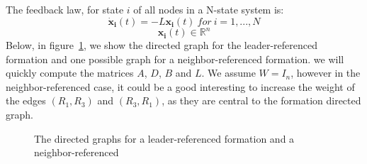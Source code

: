 \documentclass[a4paper, 12pt]{report}
\begin{document}
The feedback law, for state $i$ of all nodes in a N-state system is:
\[ \boldsymbol{\dot x_i}(t) = - L\boldsymbol{x_i}(t)\ for\ i=1, ..., N \]
\[\boldsymbol{x_i}(t) \in \mathbb{R}^n\]
Below, in figure~\ref{fig:graphs}, we show the directed graph for the leader-referenced formation and one possible graph for a neighbor-referenced formation. we will quickly compute the matrices $A$, $D$, $B$ and $L$. We assume $W = I_{n}$, however in the neighbor-referenced case, it could be a good interesting to increase the weight of the edges $(R_1, R_3)$ and $(R_3, R_1)$, as they are central to the formation directed graph.

\begin{figure}[h]
\centering
{}
\hspace{0.5cm}
\caption{The directed graphs for a leader-referenced formation and a neighbor-referenced}
\label{fig:graphs}
\end{figure}
\end{document}
